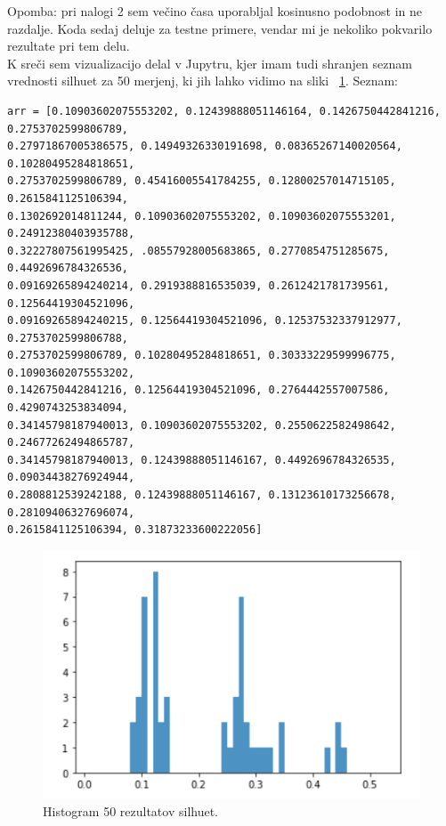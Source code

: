 \documentclass[a4paper,11pt]{article}
\begin{document}
Opomba: pri nalogi 2 sem večino časa uporabljal kosinusno podobnost in ne razdalje. Koda sedaj deluje za testne primere, vendar mi je nekoliko pokvarilo rezultate pri tem delu.
\\K sreči sem vizualizacijo delal v Jupytru, kjer imam tudi shranjen seznam vrednosti silhuet za 50 merjenj, ki jih lahko vidimo na sliki ~\ref{slika1}.
Seznam:
\begin{lstlisting}
arr = [0.10903602075553202, 0.12439888051146164, 0.1426750442841216, 0.2753702599806789,
0.27971867005386575, 0.14949326330191698, 0.08365267140020564, 0.10280495284818651,
0.2753702599806789, 0.45416005541784255, 0.12800257014715105, 0.2615841125106394,
0.1302692014811244, 0.10903602075553202, 0.10903602075553201, 0.24912380403935788,
0.32227807561995425, .08557928005683865, 0.2770854751285675, 0.4492696784326536,
0.09169265894240214, 0.2919388816535039, 0.2612421781739561, 0.12564419304521096,
0.09169265894240215, 0.12564419304521096, 0.12537532337912977, 0.2753702599806788,
0.2753702599806789, 0.10280495284818651, 0.30333229599996775, 0.10903602075553202,
0.1426750442841216, 0.12564419304521096, 0.2764442557007586, 0.4290743253834094,
0.34145798187940013, 0.10903602075553202, 0.2550622582498642, 0.24677262494865787,
0.34145798187940013, 0.12439888051146167, 0.4492696784326535, 0.09034438276924944,
0.2808812539242188, 0.12439888051146167, 0.13123610173256678, 0.28109406327696074,
0.2615841125106394, 0.31873233600222056]
\end{lstlisting}



\begin{figure}[htbp]
\begin{center}
\includegraphics[scale=0.6]{graf.png}
\caption{Histogram 50 rezultatov silhuet.}
\label{slika1}
\end{center}
\end{figure}
\end{document}
